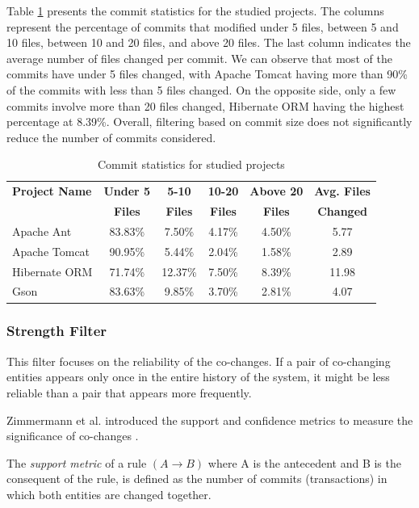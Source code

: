 \documentclass{ieeeaccess}
\begin{document}
Table \ref{tab:commit_statistics} presents the commit statistics for the studied projects. The columns represent the percentage of commits that modified under 5 files, between 5 and 10 files, between 10 and 20 files, and above 20 files. The last column indicates the average number of files changed per commit. We can observe that most of the commits have under 5 files changed, with Apache Tomcat having more than 90\% of the commits with less than 5 files changed. On the opposite side, only a few commits involve more than 20 files changed, Hibernate ORM having the highest percentage at 8.39\%. Overall, filtering based on commit size does not significantly reduce the number of commits considered.

\begin{table}[ht]
    \centering
    \caption{Commit statistics for studied projects}
    \label{tab:commit_statistics}
    \begin{tabular}{|l|c|c|c|c|c|}
        \hline
 \textbf{Project Name} & \textbf{Under 5} & \textbf{5-10} & \textbf{10-20} & \textbf{Above 20} & \textbf{Avg. Files} \\ 
        & \textbf{Files} & \textbf{Files} & \textbf{Files} & \textbf{Files} & \textbf{Changed} \\ \hline
        Apache Ant & 83.83\% & 7.50\% & 4.17\% & 4.50\% & 5.77 \\ \hline
        Apache Tomcat & 90.95\% & 5.44\% & 2.04\% & 1.58\% & 2.89 \\ \hline
        Hibernate ORM & 71.74\% & 12.37\% & 7.50\% & 8.39\% & 11.98 \\ \hline
        Gson & 83.63\% & 9.85\% & 3.70\% & 2.81\% & 4.07 \\ \hline
    \end{tabular}
\end{table}


\subsubsection{Strength Filter}

This filter focuses on the reliability of the co-changes. If a pair of co-changing entities appears only once in the entire history of the system, it might be less reliable than a pair that appears more frequently.

Zimmermann et al. introduced the support and confidence metrics to measure the significance of co-changes \cite{b7}.

The \textit{support metric} of a rule $(A \rightarrow B)$ where A is the antecedent and B is the consequent of the rule, is defined as the number of commits (transactions) in which both entities are changed together.
\end{document}
